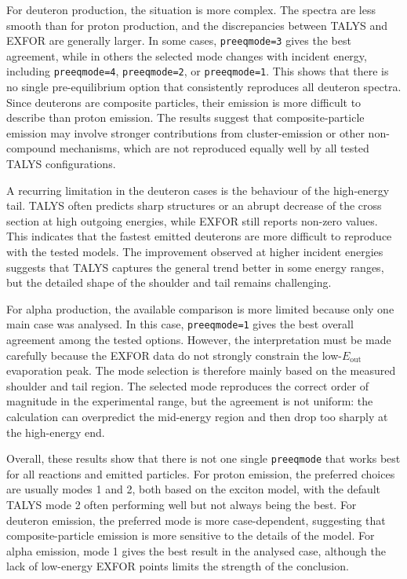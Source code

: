 For deuteron production, the situation is more complex. The spectra are less smooth than for proton production, and the discrepancies between TALYS and EXFOR are generally larger. In some cases, \texttt{preeqmode=3} gives the best agreement, while in others the selected mode changes with incident energy, including \texttt{preeqmode=4}, \texttt{preeqmode=2}, or \texttt{preeqmode=1}. This shows that there is no single pre-equilibrium option that consistently reproduces all deuteron spectra. Since deuterons are composite particles, their emission is more difficult to describe than proton emission. The results suggest that composite-particle emission may involve stronger contributions from cluster-emission or other non-compound mechanisms, which are not reproduced equally well by all tested TALYS configurations.

A recurring limitation in the deuteron cases is the behaviour of the high-energy tail. TALYS often predicts sharp structures or an abrupt decrease of the cross section at high outgoing energies, while EXFOR still reports non-zero values. This indicates that the fastest emitted deuterons are more difficult to reproduce with the tested models. The improvement observed at higher incident energies suggests that TALYS captures the general trend better in some energy ranges, but the detailed shape of the shoulder and tail remains challenging.

For alpha production, the available comparison is more limited because only one main case was analysed. In this case, \texttt{preeqmode=1} gives the best overall agreement among the tested options. However, the interpretation must be made carefully because the EXFOR data do not strongly constrain the low-\(E_{\mathrm{out}}\) evaporation peak. The mode selection is therefore mainly based on the measured shoulder and tail region. The selected mode reproduces the correct order of magnitude in the experimental range, but the agreement is not uniform: the calculation can overpredict the mid-energy region and then drop too sharply at the high-energy end.

Overall, these results show that there is not one single \texttt{preeqmode} that works best for all reactions and emitted particles. For proton emission, the preferred choices are usually modes 1 and 2, both based on the exciton model, with the default TALYS mode 2 often performing well but not always being the best. For deuteron emission, the preferred mode is more case-dependent, suggesting that composite-particle emission is more sensitive to the details of the model. For alpha emission, mode 1 gives the best result in the analysed case, although the lack of low-energy EXFOR points limits the strength of the conclusion.

